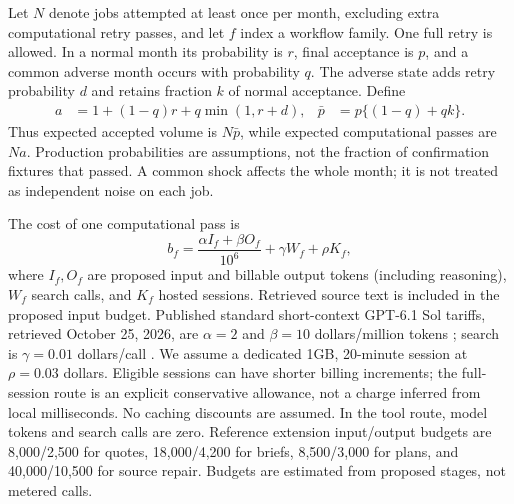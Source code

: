 Let $N$ denote jobs attempted at least once per month, excluding extra
computational retry passes, and let $f$ index a workflow family. One full retry
is allowed. In a normal month its probability is $r$, final acceptance is $p$,
and a common adverse month occurs with probability $q$. The adverse state adds
retry probability $d$ and retains fraction $k$ of normal acceptance. Define
\begin{align}
 a&=1+(1-q)r+q\min(1,r+d), &
 \bar p&=p\{(1-q)+qk\}. \label{eq:ec-acceptance}
\end{align}
Thus expected accepted volume is $N\bar p$, while expected computational passes
are $Na$. Production probabilities are assumptions, not the fraction of
confirmation fixtures that passed. A common shock affects the whole month;
it is not treated as independent noise on each job.

The cost of one computational pass is
\begin{equation}
 b_f=\frac{\alpha I_f+\beta O_f}{10^6}+\gamma W_f+\rho K_f,
 \label{eq:ec-pass}
\end{equation}
where $I_f,O_f$ are proposed input and billable output tokens (including
reasoning), $W_f$ search calls, and $K_f$ hosted sessions. Retrieved source text
is included in the proposed input budget. Published standard short-context
GPT-6.1 Sol tariffs, retrieved October 25, 2026, are $\alpha=2$ and $\beta=10$
dollars/million tokens \cite{openaisol2026}; search is $\gamma=0.01$ dollars/call
\cite{openaitools2026}. We assume a dedicated 1GB, 20-minute session at
$\rho=0.03$ dollars. Eligible sessions can have shorter billing increments;
the full-session route is an explicit conservative allowance, not a charge
inferred from local milliseconds. No caching discounts are assumed. In the
tool route, model tokens and search calls are zero. Reference extension
input/output budgets are 8,000/2,500 for quotes, 18,000/4,200 for briefs,
8,500/3,000 for plans, and 40,000/10,500 for source repair. Budgets are estimated
from proposed stages, not metered calls.

